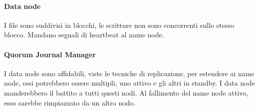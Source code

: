 \paragraph{Data node}
I file sono suddivisi in blocchi, le scritture non sono concorrenti sullo stesso 
blocco. Mandano segnali di heartbeat al name node.

 
\paragraph{Quorum Journal Manager}
I data node sono affidabili, viste le tecniche di replicazione, per estendere
ai name node, essi potrebbero essere multipli, uno attivo e gli altri in standby.
I data node manderebbero il battito a tutti questi nodi. Al fallimento del name node 
attivo, esso sarebbe rimpiazzato da un altro nodo.

